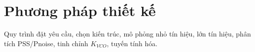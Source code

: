 \chapter{Phương pháp thiết kế}
Quy trình đặt yêu cầu, chọn kiến trúc, mô phỏng nhỏ tín hiệu, lớn tín hiệu, phân tích PSS/Pnoise, tinh chỉnh \(K_{VCO}\), tuyến tính hóa.


